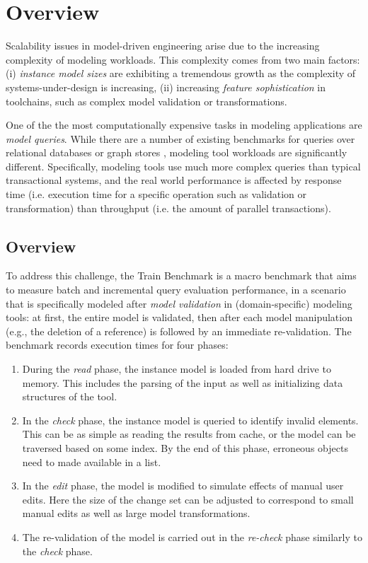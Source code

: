 \chapter{Overview}

Scalability issues in model-driven engineering arise due to the increasing
complexity of modeling workloads. This complexity comes from two main factors:
(i) \emph{instance model sizes} are exhibiting a tremendous growth as the
complexity of systems-under-design is increasing, (ii) increasing \emph{feature
sophistication} in toolchains, such as complex model validation or
transformations.

One of the the most computationally expensive tasks in modeling applications are
\emph{model queries}. While there are a number of existing benchmarks for
queries over relational databases \cite{tpc-c} or graph stores
\cite{BerlinBenchmark, SP2Bench}, modeling tool workloads are significantly
different. Specifically, modeling tools use much more complex queries than
typical transactional systems, and the real world performance is affected by
response time (i.e. execution time for a specific operation such as validation
or transformation) than throughput (i.e. the amount of parallel transactions).


\section{Overview}
To address this challenge, the Train Benchmark \cite{TB:SCP2013,TBwebsite} is a macro
benchmark that aims to measure batch and incremental query evaluation
performance, in a scenario that is specifically modeled after \emph{model
validation} in (domain-specific) modeling tools: at first, the entire model is
validated, then after each model manipulation (e.g., the deletion of a
reference) is followed by an immediate re-validation. The benchmark records
execution times for four phases:

\begin{enumerate}
 \item During the \emph{read} phase, the instance model
 is loaded from hard drive to memory. This includes the parsing of the input as
 well as initializing data structures of the tool. 
 
 \item In the \emph{check} phase, the instance model is queried to identify
 invalid elements. This can be as simple as reading the results from cache, or
 the model can be traversed based on some index. By the end of this phase,
 erroneous objects need to made available in a list.
 
 \item In the \emph{edit} phase, the model is modified to simulate effects of
 manual user edits. Here the size of the change set can be adjusted to
 correspond to small manual edits as well as large model transformations.
 
 \item The re-validation of the model is carried out in the \emph{re-check}
 phase similarly to the \emph{check} phase.
\end{enumerate}

